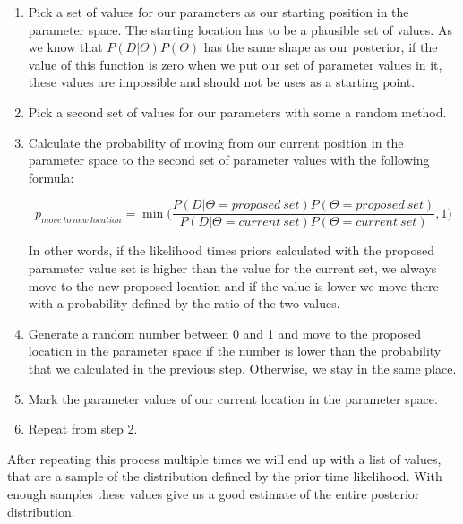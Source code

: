 \documentclass[12pt,a4paper,leqno]{report}
\theoremstyle{plain}
\theoremstyle{definition}
\theoremstyle{remark}
\begin{document}
\begin{enumerate}
    \item Pick a set of values for our parameters as our starting position in
          the parameter space. The starting location has to be a plausible set
          of values. As we know that
          \(P(D|\Theta)P(\Theta)\) has the same shape as our posterior, if
          the value of this function is zero when we put our set of
          parameter values in it, these values are impossible and should not be
          uses as a starting point.
    \item Pick a second set of values for our parameters with some a random method.
    \item Calculate the probability of moving from our current position in the
          parameter space to the second set of parameter values with the
          following formula:

          \begin{def}\label{randomwalk}
              \begin{equation*}
                  p_{move\ to\ new\ location} = \min \bigg(\frac{P(D|\Theta = proposed\ set)P(\Theta = proposed\ set)}{P(D|\Theta = current\ set)P(\Theta = current\ set)}, 1 \bigg)
              \end{equation*}
          \end{def}

          In other words, if the likelihood times priors calculated with the proposed parameter
          value set is higher than the value for the current set, we always move
          to the new proposed location and if the value
          is lower we move there with a probability defined by the ratio of the
          two values.
    \item Generate a random number between 0 and 1 and move to the proposed
          location in the parameter space if the number is lower than the
          probability that we calculated in the previous step. Otherwise, we stay
          in the same place.
    \item Mark the parameter values of our current location in the parameter space.
    \item Repeat from step 2.

\end{enumerate}

After repeating this process multiple times we will end up with a list of values,
that are a sample of the distribution defined by the prior time
likelihood. With enough samples these values give us a good estimate of the entire
posterior distribution.
\end{document}
